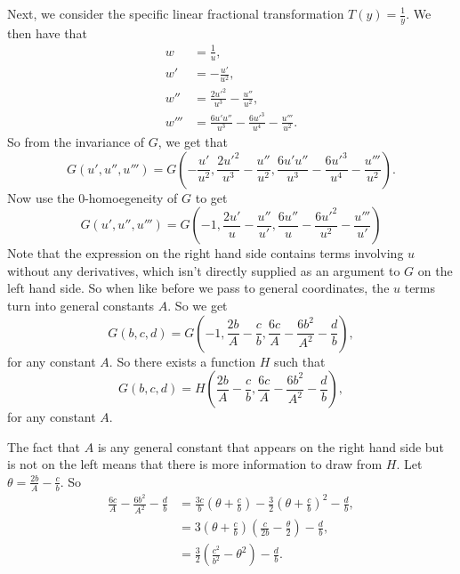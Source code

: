 Next, we consider the specific linear fractional transformation \(T(y) = \frac{1}{y}\). We then have that
\begin{align}
w & = \frac{1}{u}, \\
w' & = -\frac{u'}{u^2}, \\
w'' & = \frac{2u'^2}{u^3} - \frac{u''}{u^2}, \\
w''' & = \frac{6u'u''}{u^3} - \frac{6u'^3}{u^4} - \frac{u'''}{u^2}. 
\end{align}
So from the invariance of \(G\), we get that
\begin{equation}
G(u', u'', u''') = G\left( -\frac{u'}{u^2},
    \frac{2u'^2}{u^3} - \frac{u''}{u^2},
    \frac{6u'u''}{u^3} - \frac{6u'^3}{u^4} - \frac{u'''}{u^2} \right). 
\end{equation}
Now use the 0-homoegeneity of \(G\) to get
\begin{equation}
G(u', u'', u''') = G\left(-1, 
    \frac{2u'}{u} - \frac{u''}{u'}, 
    \frac{6u''}{u} - \frac{6u'^2}{u^2} - \frac{u'''}{u'}\right)
\end{equation}
Note that the expression on the right hand side contains terms involving \(u\) without any derivatives,
which isn't directly supplied as an argument to \(G\) on the left hand side. So when like before we
pass to general coordinates, the \(u\) terms turn into general constants \(A\). So we get
\begin{equation}
G(b, c, d) = G\left(-1, 
    \frac{2b}{A} - \frac{c}{b}, 
    \frac{6c}{A} - \frac{6b^2}{A^2} - \frac{d}{b}\right),
\end{equation} 
for any constant \(A\). So there exists a function \(H\) such that
\begin{equation}
G(b, c, d) = H\left(
    \frac{2b}{A} - \frac{c}{b}, 
    \frac{6c}{A} - \frac{6b^2}{A^2} - \frac{d}{b}\right),
\end{equation}
for any constant \(A\).

The fact that \(A\) is any general constant that appears on the right hand side but is not on the left means that 
there is more information to draw from \(H\). Let \(\theta = \frac{2b}{A} - \frac{c}{b}\). So
\begin{align}
\frac{6c}{A} - \frac{6b^2}{A^2} - \frac{d}{b} & = 
    \frac{3c}{b}\left(\theta + \frac{c}{b}\right)
    - \frac{3}{2}\left(\theta + \frac{c}{b}\right)^2 - \frac{d}{b}, \\
& = 3\left(\theta + \frac{c}{b}\right)\left(\frac{c}{2b} - \frac{\theta}{2}\right) - \frac{d}{b}, \\
& = \frac{3}{2}\left(\frac{c^2}{b^2} - \theta^2\right) - \frac{d}{b}.
\end{align}

